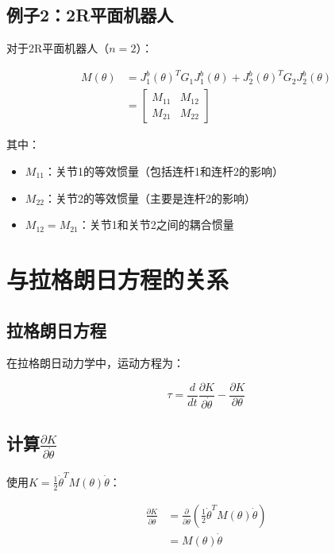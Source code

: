\documentclass[12pt,a4paper]{article}
\begin{document}
\subsection{例子2：2R平面机器人}

对于2R平面机器人（$n = 2$）：

\begin{align}
M(\theta) &= J_1^b(\theta)^T G_1 J_1^b(\theta) + J_2^b(\theta)^T G_2 J_2^b(\theta) \\
&= \begin{bmatrix} M_{11} & M_{12} \\ M_{21} & M_{22} \end{bmatrix}
\end{align}

其中：
\begin{itemize}
\item $M_{11}$：关节1的等效惯量（包括连杆1和连杆2的影响）
\item $M_{22}$：关节2的等效惯量（主要是连杆2的影响）
\item $M_{12} = M_{21}$：关节1和关节2之间的耦合惯量
\end{itemize}

\section{与拉格朗日方程的关系}

\subsection{拉格朗日方程}

在拉格朗日动力学中，运动方程为：

\begin{equation}
\tau = \frac{d}{dt}\frac{\partial K}{\partial \dot{\theta}} - \frac{\partial K}{\partial \theta}
\end{equation}

\subsection{计算$\frac{\partial K}{\partial \dot{\theta}}$}

使用$K = \frac{1}{2}\dot{\theta}^T M(\theta) \dot{\theta}$：

\begin{align}
\frac{\partial K}{\partial \dot{\theta}} &= \frac{\partial}{\partial \dot{\theta}} \left(\frac{1}{2}\dot{\theta}^T M(\theta) \dot{\theta}\right) \\
&= M(\theta) \dot{\theta}
\end{align}
\end{document}
